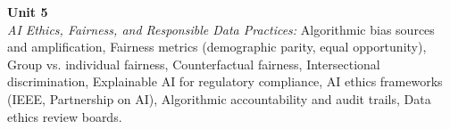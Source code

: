 \vspace{0.3cm}

\noindent\textbf{Unit 5} \\
\textit{AI Ethics, Fairness, and Responsible Data Practices:} Algorithmic bias sources and amplification, Fairness metrics (demographic parity, equal opportunity), Group vs. individual fairness, Counterfactual fairness, Intersectional discrimination, Explainable AI for regulatory compliance, AI ethics frameworks (IEEE, Partnership on AI), Algorithmic accountability and audit trails, Data ethics review boards.

\newpage
{}
